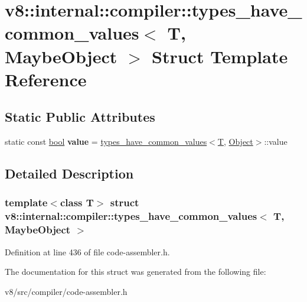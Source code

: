 \hypertarget{structv8_1_1internal_1_1compiler_1_1types__have__common__values_3_01T_00_01MaybeObject_01_4}{}\section{v8\+:\+:internal\+:\+:compiler\+:\+:types\+\_\+have\+\_\+common\+\_\+values$<$ T, Maybe\+Object $>$ Struct Template Reference}
\label{structv8_1_1internal_1_1compiler_1_1types__have__common__values_3_01T_00_01MaybeObject_01_4}
\subsection*{Static Public Attributes}
\begin{DoxyCompactItemize}
\item 
\mbox{\label{structv8_1_1internal_1_1compiler_1_1types__have__common__values_3_01T_00_01MaybeObject_01_4_a2db489cbb9dca2e60c93412263ebe71b}} 
static const \mbox{\hyperlink{classbool}{bool}} {\bfseries value} = \mbox{\hyperlink{structv8_1_1internal_1_1compiler_1_1types__have__common__values}{types\+\_\+have\+\_\+common\+\_\+values}}$<$\mbox{\hyperlink{classv8_1_1internal_1_1torque_1_1T}{T}}, \mbox{\hyperlink{classv8_1_1internal_1_1Object}{Object}}$>$\+::value
\end{DoxyCompactItemize}


\subsection{Detailed Description}
\subsubsection*{template$<$class T$>$\newline
struct v8\+::internal\+::compiler\+::types\+\_\+have\+\_\+common\+\_\+values$<$ T, Maybe\+Object $>$}



Definition at line 436 of file code-\/assembler.\+h.



The documentation for this struct was generated from the following file\+:\begin{DoxyCompactItemize}
\item 
v8/src/compiler/code-\/assembler.\+h\end{DoxyCompactItemize}
